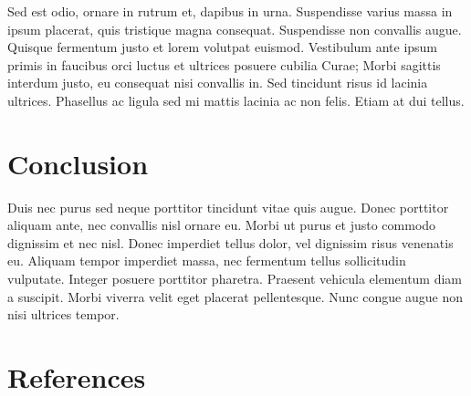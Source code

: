 \documentclass{acm_proc_article-sp}
\begin{document}
Sed est odio, ornare in rutrum et, dapibus in urna. Suspendisse varius
massa in ipsum placerat, quis tristique magna consequat. Suspendisse non
convallis augue. Quisque fermentum justo et lorem volutpat euismod.
Vestibulum ante ipsum primis in faucibus orci luctus et ultrices posuere
cubilia Curae; Morbi sagittis interdum justo, eu consequat nisi
convallis in. Sed tincidunt risus id lacinia ultrices. Phasellus ac
ligula sed mi mattis lacinia ac non felis. Etiam at dui tellus.

\hypertarget{conclusion}{%
\section{Conclusion}\label{conclusion}}

Duis nec purus sed neque porttitor tincidunt vitae quis augue. Donec
porttitor aliquam ante, nec convallis nisl ornare eu. Morbi ut purus et
justo commodo dignissim et nec nisl. Donec imperdiet tellus dolor, vel
dignissim risus venenatis eu. Aliquam tempor imperdiet massa, nec
fermentum tellus sollicitudin vulputate. Integer posuere porttitor
pharetra. Praesent vehicula elementum diam a suscipit. Morbi viverra
velit eget placerat pellentesque. Nunc congue augue non nisi ultrices
tempor.

\hypertarget{references}{%
\section*{References}\label{references}}

\hypertarget{refs}{}
\begin{CSLReferences}{0}{0}
\leavevmode\hypertarget{ref-fenner2012a}{}%
\CSLLeftMargin{{[}1{]} }

\leavevmode\hypertarget{ref-meier2012}{}%
\CSLLeftMargin{{[}2{]} }

\end{CSLReferences}
\setlength{\parindent}{0in}
\end{document}
